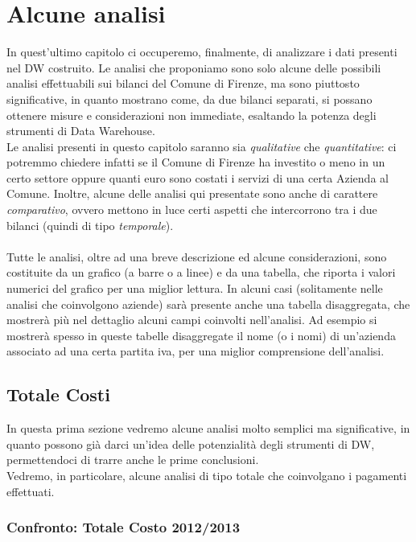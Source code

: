 \chapter{Alcune analisi} \label{chap:analisi}
	
	In quest'ultimo capitolo ci occuperemo, finalmente, di analizzare i dati presenti nel DW costruito. Le analisi che proponiamo sono solo alcune delle possibili analisi effettuabili sui bilanci del Comune di Firenze, ma sono piuttosto significative, in quanto mostrano come, da due bilanci separati, si possano ottenere misure e considerazioni non immediate, esaltando la potenza degli strumenti di Data Warehouse.\\
	Le analisi presenti in questo capitolo saranno sia \textit{qualitative} che \textit{quantitative}: ci potremmo chiedere infatti se il Comune di Firenze ha investito o meno in un certo settore oppure quanti euro sono costati i servizi di una certa Azienda al Comune. Inoltre, alcune delle analisi qui presentate sono anche di carattere \textit{comparativo}, ovvero mettono in luce certi aspetti che intercorrono tra i due bilanci (quindi di tipo \textit{temporale}).\\
	\\
	Tutte le analisi, oltre ad una breve descrizione ed alcune considerazioni, sono costituite da un grafico (a barre o a linee) e da una tabella, che riporta i valori numerici del grafico per una miglior lettura. In alcuni casi (solitamente nelle analisi che coinvolgono aziende) sarà presente anche una tabella disaggregata, che mostrerà più nel dettaglio alcuni campi coinvolti nell'analisi. Ad esempio si mostrerà spesso in queste tabelle disaggregate il nome (o i nomi) di un'azienda associato ad una certa partita iva, per una miglior comprensione dell'analisi.
	
	\section{Totale Costi} \label{sec:costi}
		
		In questa prima sezione vedremo alcune analisi molto semplici ma significative, in quanto possono già darci un'idea delle potenzialità degli strumenti di DW, permettendoci di trarre anche le prime conclusioni.\\
		Vedremo, in particolare, alcune analisi di tipo totale che coinvolgano i pagamenti effettuati.
		
		\subsection{Confronto: Totale Costo 2012/2013} \label{subsec:costi}
			
